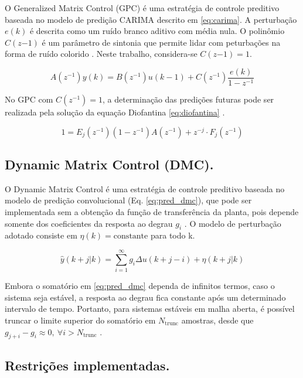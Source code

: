 \documentclass{article}
\begin{document}
O Generalized Matrix Control (GPC) é uma estratégia de controle preditivo baseada no modelo de predição CARIMA descrito em \eqref{eq:carima}. A perturbação \(e(k)\) é descrita como um ruído branco aditivo com média nula. O polinômio \(C(z{-1})\) é um parâmetro de sintonia que permite lidar com peturbações na forma de ruído colorido \cite{Camacho2004}. Neste trabalho, considera-se \(C(z{-1}) = 1\).

\begin{equation}
  A(z^{-1}) y(k) = B(z^{-1}) u(k-1) + C(z^{-1}) \frac{e(k)}{1 - z^{-1}}
  \label{eq:carima}
\end{equation}

No GPC com \(C(z^{-1}) = 1\), a determinação das predições futuras pode ser realizada pela solução da equação Diofantina \eqref{eq:diofantina} \cite{Julio2024}.

\begin{equation}
  1 = E_j(z^{-1}) (1-z^{-1})A(z^{-1}) + z^{-j} \cdot F_j(z^{-1})
  \label{eq:diofantina}
\end{equation}

\subsection{Dynamic Matrix Control (DMC).}

O Dynamic Matrix Control é uma estratégia de controle preditivo baseada no modelo de predição convolucional (Eq. \eqref{eq:pred_dmc}), que pode ser implementada sem a obtenção da função de transferência da planta, pois depende somente dos coeficientes da resposta ao degrau \(g_i\) \cite{Julio2024}. O modelo de perturbação adotado consiste em \(\eta(k) = \text{constante}\) para todo k.

\begin{equation}
  \hat{y}(k + j | k) = \sum_{i=1}^{\infty} g_i \Delta u(k+j-i) + \eta (k + j | k)
  \label{eq:pred_dmc}
\end{equation}

Embora o somatório em \eqref{eq:pred_dmc} dependa de infinitos termos, caso o sistema seja estável, a resposta ao degrau fica constante após um determinado intervalo de tempo. Portanto, para sistemas estáveis em malha aberta, é possível truncar o limite superior do somatório em \(N_\text{trunc}\) amostras, desde que \(g_{j+i} - g_i \approx 0,\ \forall i > N_\text{trunc}\) \cite{Julio2024}.

\subsection{Restrições implementadas.}
\end{document}
